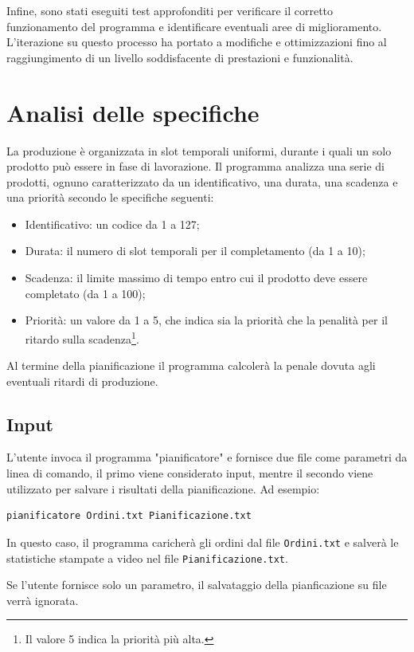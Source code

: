 \documentclass[a4paper]{report}
\begin{document}
Infine, sono stati eseguiti test approfonditi per verificare il corretto
funzionamento del programma e identificare eventuali aree di miglioramento.
L'iterazione su questo processo ha portato a modifiche e ottimizzazioni
fino al raggiungimento di un livello soddisfacente di prestazioni e funzionalità.

\section{Analisi delle specifiche}
La produzione è organizzata in slot temporali uniformi, durante i quali un solo prodotto può essere in fase di lavorazione.
Il programma analizza una serie di prodotti, ognuno caratterizzato da un identificativo, una durata, una scadenza e una priorità secondo le specifiche seguenti:
\begin{itemize}
    \item Identificativo: un codice da 1 a 127;
    \item Durata: il numero di slot temporali per il completamento (da 1 a 10);
    \item Scadenza: il limite massimo di tempo entro cui il prodotto deve essere completato (da 1 a 100);
    \item Priorità: un valore da 1 a 5, che indica sia la priorità che la penalità per il ritardo sulla scadenza\footnote{Il valore 5 indica la priorità più alta.}.
\end{itemize}
Al termine della pianificazione il programma calcolerà la penale dovuta agli eventuali ritardi di produzione.

\subsection{Input}
L'utente invoca il programma  "pianificatore" e fornisce due file come parametri da linea di comando, il primo viene considerato input, mentre il secondo viene utilizzato per salvare i risultati della pianificazione. Ad esempio:

\begin{verbatim}
pianificatore Ordini.txt Pianificazione.txt
\end{verbatim}

In questo caso, il programma caricherà gli ordini dal file \texttt{Ordini.txt} e salverà le statistiche stampate a video nel file \texttt{Pianificazione.txt}.

Se l'utente fornisce solo un parametro, il salvataggio della pianficazione su file verrà ignorata.
\end{document}
